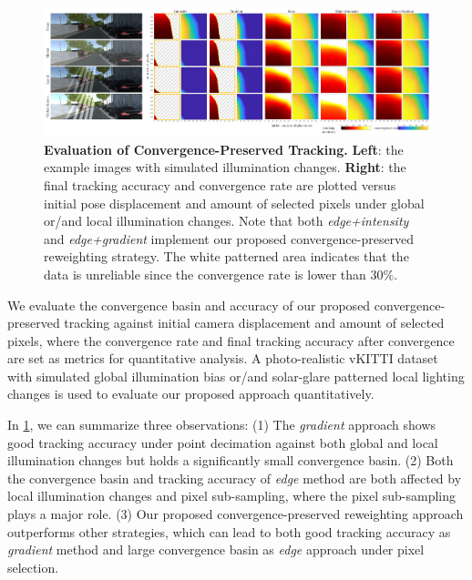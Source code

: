 \begin{figure} 
	\centering
  	\includegraphics[width=\linewidth]{figures/illumination/edge_evaltracking.pdf}
    \caption[Evaluation of Convergence-Preserved Tracking]{ \textbf{Evaluation of Convergence-Preserved Tracking.} \textbf{Left}: the example images with simulated illumination changes. \textbf{Right}: the final tracking accuracy and convergence rate are plotted versus initial pose displacement and amount of selected pixels under global or/and local illumination changes. Note that both {\em edge+intensity} and {\em edge+gradient} implement our proposed convergence-preserved reweighting strategy. The white patterned area indicates that the data is unreliable since the convergence rate is lower than $30\%$.
	\label{fig:edge_evaltracking}}
\end{figure}

We evaluate the convergence basin and accuracy of our proposed convergence-preserved tracking against initial camera displacement and amount of selected pixels, where the convergence rate and final tracking accuracy after convergence are set as metrics for quantitative analysis. 
A photo-realistic vKITTI \cite{gaidon2016virtual} dataset with simulated global illumination bias or/and solar-glare patterned local lighting changes is used to evaluate our proposed approach quantitatively.

In \ref{fig:edge_evaltracking}, we can summarize three observations: 
(1) The {\em gradient} approach shows good tracking accuracy under point decimation against both global and local illumination changes but holds a significantly small convergence basin. 
(2) Both the convergence basin and tracking accuracy of {\em edge} method are both affected by local illumination changes and pixel sub-sampling, where the pixel sub-sampling plays a major role. 
(3) Our proposed convergence-preserved reweighting approach outperforms other strategies, which can lead to both good tracking accuracy as {\em gradient} method and large convergence basin as {\em edge} approach under pixel selection.


